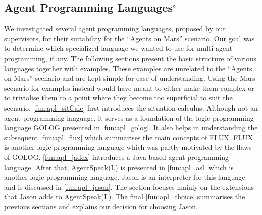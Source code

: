 \subsection[Agent Programming Languages]{Agent Programming Languages$^\circ$}
We investigated several agent programming languages, proposed by our supervisors, for their suitability for the \enquote{Agents on Mars} scenario.
Our goal was to determine which specialized language we wanted to use for multi-agent programming, if any.
The following sections present the basic structure of various languages together with examples.
These examples are unrelated to the \enquote{Agents on Mars} scenario and are kept simple for ease of understanding.
Using the Mars-scenario for examples instead would have meant to either make them complex or to trivialise them to a point where they become too superficial to suit the scenario.
\autoref{fun:apl_sitCalc} first introduces the situation calculus.
Although not an agent programming language, it serves as a foundation of the logic programming language GOLOG presented in \autoref{fun:apl_golog}.
It also helps in understanding the subsequent \autoref{fun:apl_flux} which summarises the main concepts of FLUX.
FLUX is another logic programming language which was partly motivated by the flaws of GOLOG.
\autoref{fun:apl_jadex} introduces a Java-based agent programming language. After that, AgentSpeak(L) is presented in \autoref{fun:apl_asl} which is another logic programming language.
Jason is an interpreter for this language and is discussed in \autoref{fun:apl_jason}.
The section focuses mainly on the extensions that Jason adds to AgentSpeak(L).
The final \autoref{fun:apl_choice} summarises the previous sections and explains our decision for choosing Jason.















